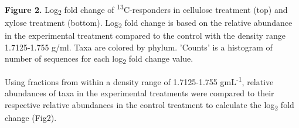 \textbf{Figure 2.}  Log\textsubscript{2} fold change of \textsuperscript{13}C-responders in cellulose treatment (top) and xylose treatment (bottom).  Log\textsubscript{2} fold change is based on the relative abundance in the experimental treatment compared to the control with the density range 1.7125-1.755 g/ml. Taxa are colored by phylum. 'Counts' is a histogram of number of sequences for each log\textsubscript{2} fold change value.    

Using fractions from within a density range of 1.7125-1.755 gmL\textsuperscript{-1}, relative abundances of taxa in the experimental treatments were compared to their respective relative abundances in the control treatment to calculate the log\textsubscript{2} fold change (Fig2).